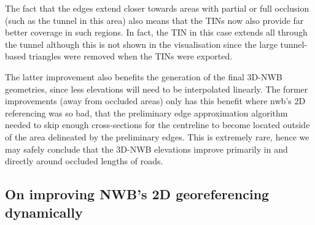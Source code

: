 The fact that the edges extend closer towards areas with partial or full occlusion (such as the tunnel in this area) also means that the TINs now also provide far better coverage in such regions. In fact, the TIN in this case extends all through the tunnel although this is not shown in the visualisation since the large tunnel-based triangles were removed when the TINs were exported.

The latter improvement also benefits the generation of the final 3D-NWB geometries, since less elevations will need to be interpolated linearly. The former improvements (away from occluded areas) only has this benefit where \ac{nwb}'s 2D referencing was so bad, that the preliminary edge approximation algorithm needed to skip enough cross-sections for the centreline to become located outside of the area delineated by the preliminary edges. This is extremely rare, hence we may safely conclude that the 3D-NWB elevations improve primarily in and directly around occluded lengths of roads.

\subsection{On improving NWB's 2D georeferencing dynamically}
\label{sub:nwb_updated_dynamic}